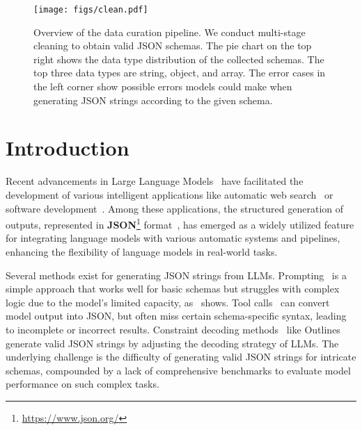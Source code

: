 \begin{figure*}[htb]
\centering
\texttt{[image: figs/clean.pdf]}
\caption{Overview of the data curation pipeline. 
We conduct multi-stage cleaning to obtain valid JSON schemas. 
The pie chart on the top right shows the data type distribution of the collected schemas.
The top three data types are string, object, and array.
The error cases in the left corner show possible errors models could make when generating JSON strings according to the given schema.
}
\label{fig:combined-stats}
\end{figure*}

\section{Introduction}
Recent advancements in Large Language Models~\citep{openai2023gpt4,chowdhery2022palm,touvron2023llama,zeng2022glm} have facilitated the development of various intelligent applications like automatic web search~\citep{qin2023webcpm} or software development~\citep{qian2023communicative}.
Among these applications, the structured generation of outputs, represented in \textbf{JSON}\footnote{\url{https://www.json.org/}} format~\citep{chen2025llmer,escarda2024llms}, 
has emerged as a widely utilized feature for integrating language models with various automatic systems and pipelines, enhancing the flexibility of language models in real-world tasks.

Several methods exist for generating JSON strings from LLMs.
Prompting~\citep{pokrass2023structured, he2024doespromptformattingimpact} is a simple approach that works well for basic schemas but struggles with complex logic due to the model’s limited capacity, as~ shows.
Tool calls~\cite {schick2023toolformer,qin2023toolllm} can convert model output into JSON, but often miss certain schema-specific syntax, leading to incomplete or incorrect results. 
Constraint decoding methods~\citep{deutsch2019general,poesia2022synchromesh,geng2023grammar} like Outlines generate valid JSON strings by adjusting the decoding strategy of LLMs.
The underlying challenge is the difficulty of generating valid JSON strings for intricate schemas, compounded by a lack of comprehensive benchmarks to evaluate model performance on such complex tasks. 


